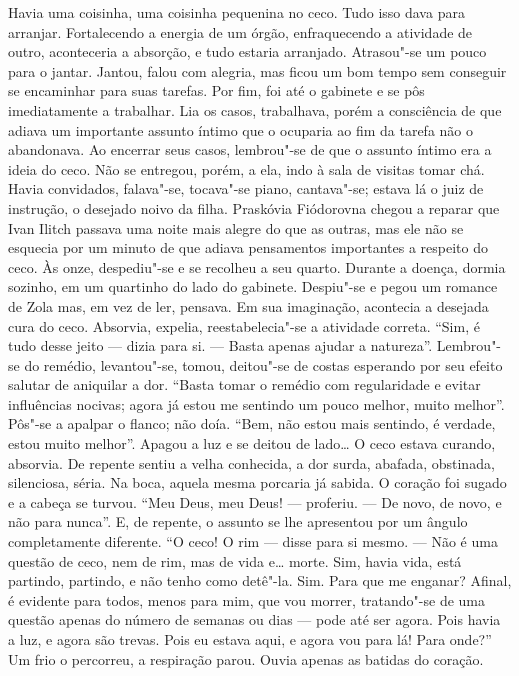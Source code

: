 Havia uma coisinha, uma coisinha pequenina no ceco. Tudo isso dava para
arranjar. Fortalecendo a energia de um órgão, enfraquecendo a atividade
de outro, aconteceria a absorção, e tudo estaria arranjado. Atrasou"-se
um pouco para o jantar. Jantou, falou com alegria, mas ficou um bom
tempo sem conseguir se encaminhar para suas tarefas. Por fim, foi até o
gabinete e se pôs imediatamente a trabalhar. Lia os casos, trabalhava,
porém a consciência de que adiava um importante assunto íntimo que o
ocuparia ao fim da tarefa não o abandonava. Ao encerrar seus casos,
lembrou"-se de que o assunto íntimo era a ideia do ceco. Não se entregou,
porém, a ela, indo à sala de visitas tomar chá. Havia convidados,
falava"-se, tocava"-se piano, cantava"-se; estava lá o juiz de instrução, o
desejado noivo da filha. Praskóvia Fiódorovna chegou a reparar que Ivan
Ilitch passava uma noite mais alegre do que as outras, mas ele não se
esquecia por um minuto de que adiava pensamentos importantes a respeito
do ceco. Às onze, despediu"-se e se recolheu a seu quarto. Durante a
doença, dormia sozinho, em um quartinho do lado do gabinete. Despiu"-se e
pegou um romance de Zola mas, em vez de ler, pensava. Em sua imaginação,
acontecia a desejada cura do ceco. Absorvia, expelia, reestabelecia"-se a
atividade correta. ``Sim, é tudo desse jeito --- dizia para si. --- Basta
apenas ajudar a natureza''. Lembrou"-se do remédio, levantou"-se, tomou,
deitou"-se de costas esperando por seu efeito salutar de aniquilar a dor.
``Basta tomar o remédio com regularidade e evitar influências nocivas;
agora já estou me sentindo um pouco melhor, muito melhor''. Pôs"-se a
apalpar o flanco; não doía. ``Bem, não estou mais sentindo, é verdade,
estou muito melhor''. Apagou a luz e se deitou de lado\ldots{} O ceco estava
curando, absorvia. De repente sentiu a velha conhecida, a dor surda,
abafada, obstinada, silenciosa, séria. Na boca, aquela mesma porcaria já
sabida. O coração foi sugado e a cabeça se turvou. ``Meu Deus, meu Deus!
--- proferiu. --- De novo, de novo, e não para nunca''. E, de repente, o
assunto se lhe apresentou por um ângulo completamente diferente. ``O
ceco! O rim --- disse para si mesmo. --- Não é uma questão de ceco, nem de
rim, mas de vida e\ldots{} morte. Sim, havia vida, está partindo, partindo, e
não tenho como detê"-la. Sim. Para que me enganar? Afinal, é evidente
para todos, menos para mim, que vou morrer, tratando"-se de uma questão
apenas do número de semanas ou dias --- pode até ser agora. Pois havia a
luz, e agora são trevas. Pois eu estava aqui, e agora vou para lá! Para
onde?'' Um frio o percorreu, a respiração parou. Ouvia apenas as batidas
do coração.

